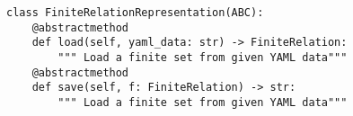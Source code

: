 \par\begin{minipage}{60ex}
\begin{verbatim}
class FiniteRelationRepresentation(ABC):
    @abstractmethod
    def load(self, yaml_data: str) -> FiniteRelation:
        """ Load a finite set from given YAML data"""
    @abstractmethod
    def save(self, f: FiniteRelation) -> str:
        """ Load a finite set from given YAML data"""
\end{verbatim}
\end{minipage}\par